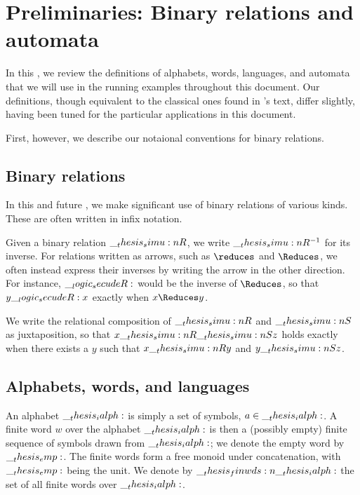 \chapter{Preliminaries: Binary relations and automata}\label{ch:automata}\label{ch:finite-automata}

In this , we review the definitions of alphabets, words, languages, and automata that we will use in the running examples throughout this document.
Our definitions, though equivalent to the classical ones found in \textcite{Hopcroft+Ullman:??}'s text, differ slightly, having been tuned for the particular applications in this document.

First, however, we describe our notaional conventions for binary relations.

\section{Binary relations}

In this and future , we make significant use of binary relations of various kinds.
These are often written in infix notation.

Given a binary relation $\__thesis_simu:n {R}$, we write $\__thesis_simu:n {R}^{-1}$ for its inverse.
For relations written as arrows, such as $\reduces$ and $\Reduces$, we often instead express their inverses by writing the arrow in the other direction.
For instance, $\__logic_secudeR:$ would be the inverse of $\Reduces$, so that $y \__logic_secudeR: x$ exactly when $x \Reduces y$.

We write the relational composition of $\__thesis_simu:n {R}$ and $\__thesis_simu:n {S}$ as juxtaposition, so that $x \__thesis_simu:n {R}\__thesis_simu:n {S} z$ holds exactly when there exists a $y$ such that $x \__thesis_simu:n {R} y$ and $y \__thesis_simu:n {S} z$.

\section{Alphabets, words, and languages}

An alphabet $\__thesis_ialph:$ is simply a set of symbols, $a \in \__thesis_ialph:$.
A finite word $w$ over the alphabet $\__thesis_ialph:$ is then a (possibly empty) finite sequence of symbols drawn from $\__thesis_ialph:$;
we denote the empty word by $\__thesis_emp:$.
The finite words form a free monoid under concatenation, with $\__thesis_emp:$ being the unit.
We denote by $\__thesis_finwds:n {\__thesis_ialph:}$ the set of all finite words over $\__thesis_ialph:$.

